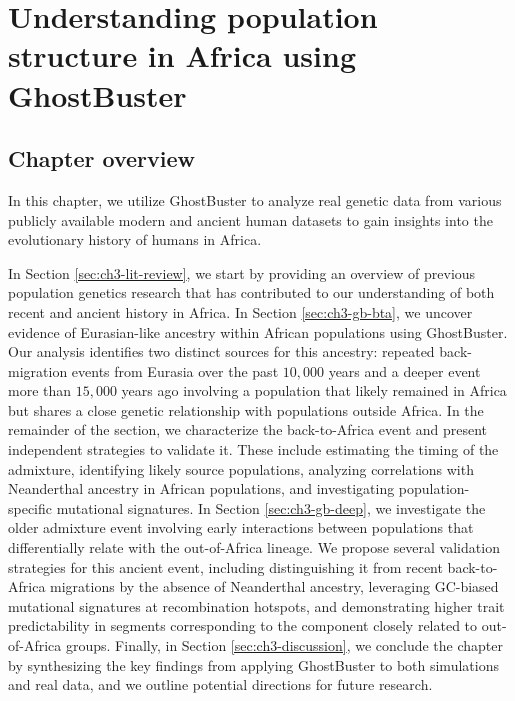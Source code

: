\chapter{\label{ch:3-gb-result}Understanding population structure in Africa using GhostBuster}

\minitoc

\section{Chapter overview}

In this chapter, we utilize GhostBuster to analyze real genetic data from various publicly available modern and ancient human datasets to gain insights into the evolutionary history of humans in Africa. 

In Section \ref{sec:ch3-lit-review}, we start by providing an overview of previous population genetics research that has contributed to our understanding of both recent and ancient history in Africa.
%
In Section \ref{sec:ch3-gb-bta}, we uncover evidence of Eurasian-like ancestry within African populations using GhostBuster. Our analysis identifies two distinct sources for this ancestry: repeated back-migration events from Eurasia over the past $10{,}000$ years and a deeper event more than $15{,}000$ years ago involving a population that likely remained in Africa but shares a close genetic relationship with populations outside Africa. 
%
In the remainder of the section, we characterize the back-to-Africa event and present independent strategies to validate it. These include estimating the timing of the admixture, identifying likely source populations, analyzing correlations with Neanderthal ancestry in African populations, and investigating population-specific mutational signatures.
%
In Section \ref{sec:ch3-gb-deep}, we investigate the older admixture event involving early interactions between populations that differentially relate with the out-of-Africa lineage. 
%
We propose several validation strategies for this ancient event, including distinguishing it from recent back-to-Africa migrations by the absence of Neanderthal ancestry, leveraging GC-biased mutational signatures at recombination hotspots, and demonstrating higher trait predictability in segments corresponding to the component closely related to out-of-Africa groups.
%
Finally, in Section \ref{sec:ch3-discussion}, we conclude the chapter by synthesizing the key findings from applying GhostBuster to both simulations and real data, and we outline potential directions for future research.



